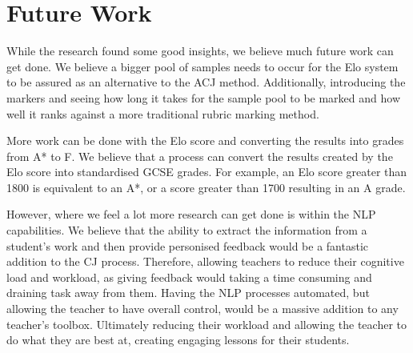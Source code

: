 

\section{Future Work}
\label{sec:conclusion_future_wk}

While the research found some good insights, we believe much future work can get done. We believe a bigger pool of samples needs to occur for the Elo system to be assured as an alternative to the ACJ method. Additionally, introducing the markers and seeing how long it takes for the sample pool to be marked and how well it ranks against a more traditional rubric marking method.


More work can be done with the Elo score and converting the results into grades from A* to F. We believe that a process can convert the results created by the Elo score into standardised GCSE grades. For example, an Elo score greater than 1800 is equivalent to an A*, or a score greater than 1700 resulting in an A grade.

However, where we feel a lot more research can get done is within the NLP capabilities. We believe that the ability to extract the information from a student's work and then provide personised feedback would be a fantastic addition to the CJ process. Therefore, allowing teachers to reduce their cognitive load and workload, as giving feedback would taking a time consuming and draining task away from them. Having the NLP processes automated, but allowing the teacher to have overall control, would be a massive addition to any teacher's toolbox. Ultimately reducing their workload and allowing the teacher to do what they are best at, creating engaging lessons for their students.
